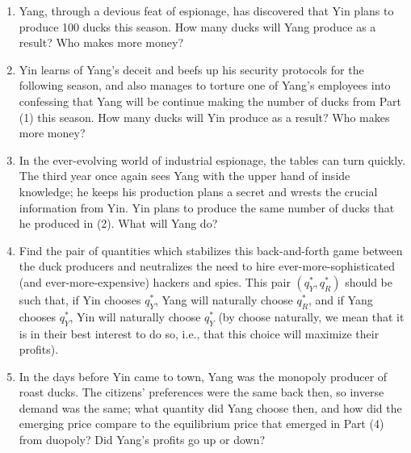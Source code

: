 \documentclass{article}
\begin{document}
\begin{enumerate}
\item Yang, through a devious feat of espionage, has discovered that Yin plans to produce 100 ducks this season. How many ducks will Yang produce as a result? Who makes more money?

\item Yin learns of Yang's deceit and beefs up his security protocols for the following season, and also manages to torture one of Yang's employees into confessing that Yang will be continue making the number of ducks from Part (1) this season. How many ducks will Yin produce as a result? Who makes more money?

\item In the ever-evolving world of industrial espionage, the tables can turn quickly. The third year once again sees Yang with the upper hand of inside knowledge; he keeps his production plans a secret and wrests the crucial information from Yin. Yin plans to produce the same number of ducks that he produced in (2). What will Yang do?

\item Find the pair of quantities which stabilizes this back-and-forth game between the duck producers and neutralizes the need to hire ever-more-sophisticated (and ever-more-expensive) hackers and spies. This pair $(q_Y^{*}, q_R^{*})$ should be such that, if Yin chooses $q_Y^{*}$, Yang will naturally choose $q_R^{*}$, and if Yang chooses $q_Y^{*}$, Yin will naturally choose $q_Y^{*}$ (by choose naturally, we mean that it is in their best interest to do so, i.e., that this choice will maximize their profits).

\item In the days before Yin came to town, Yang was the monopoly producer of roast ducks. The citizens' preferences were the same back then, so inverse demand was the same; what quantity did Yang choose then, and how did the emerging price compare to the equilibrium price that emerged in Part (4) from duopoly? Did Yang's profits go up or down?
\end{enumerate}
\end{document}
